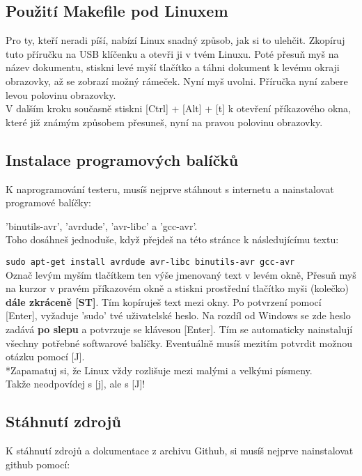 \subsection{Použití Makefile pod Linuxem}

Pro ty, kteří neradi píší, nabízí Linux snadný způsob, jak si to ulehčit.
Zkopíruj tuto příručku na USB klíčenku a otevři ji v tvém Linuxu. 
Poté přesuň myš na název dokumentu, stiskni levé myší tlačítko a táhni dokument k levému okraji obrazovky, až se zobrazí možný rámeček. Nyní  myš uvolni.
Příručka nyní zabere levou polovinu obrazovky.\\
V dalším kroku současně stiskni [Ctrl] + [Alt] + [t] k otevření příkazového okna, které již známým 
způsobem přesuneš, nyní na pravou polovinu obrazovky.

\subsection{Instalace programových balíčků}

K naprogramování testeru, musíš nejprve stáhnout s internetu a nainstalovat programové balíčky:

 'binutils-avr', 'avrdude', 'avr-libc' a 'gcc-avr'.\\
Toho dosáhneš jednoduše, když přejdeš na této stránce k následujícímu textu:

\verb"sudo apt-get install avrdude avr-libc binutils-avr gcc-avr"\\
Označ levým myším tlačítkem ten výše jmenovaný text v levém okně,
Přesuň myš na kurzor v pravém příkazovém okně a stiskni prostřední tlačítko myši (kolečko) \textbf{dále zkráceně [ST]}. Tím kopíruješ text mezi okny.
Po potvrzení pomocí [Enter], vyžaduje 'sudo' tvé uživatelské heslo. Na rozdíl od Windows se zde heslo zadává \textbf{po slepu} a potvrzuje se klávesou [Enter].
Tím se automaticky nainstalují všechny potřebné softwarové balíčky.
Eventuálně musíš  mezitím potvrdit možnou otázku pomocí [J].
\\*Zapamatuj si, že Linux vždy rozlišuje mezi malými a velkými písmeny.
\\ Takže neodpovídej s [j], ale s [J]!

\subsection{Stáhnutí zdrojů}

K stáhnutí zdrojů a dokumentace z archivu Github, si musíš nejprve nainstalovat github pomocí:

